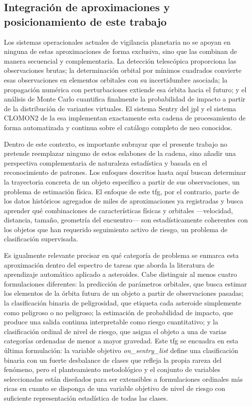 \documentclass[12pt]{report} %
\begin{document}
\subsection{Integración de aproximaciones y posicionamiento de este trabajo}
 
Los sistemas operacionales actuales de vigilancia planetaria no se apoyan en ninguna de estas aproximaciones de forma exclusiva, sino que las combinan de manera secuencial y complementaria. La detección telescópica proporciona las observaciones brutas; la determinación orbital por mínimos cuadrados convierte esas observaciones en elementos orbitales con su incertidumbre asociada; la propagación numérica con perturbaciones extiende esa órbita hacia el futuro; y el análisis de Monte Carlo cuantifica finalmente la probabilidad de impacto a partir de la distribución de variantes virtuales. El sistema Sentry del \gls{jpl} y el sistema CLOMON2 de la \gls{esa} implementan exactamente esta cadena de procesamiento de forma automatizada y continua sobre el catálogo completo de \gls{neo} conocidos.
 
Dentro de este contexto, es importante subrayar que el presente trabajo no pretende reemplazar ninguno de estos eslabones de la cadena, sino añadir una perspectiva complementaria de naturaleza estadística y basada en el reconocimiento de patrones. Los enfoques descritos hasta aquí buscan determinar la trayectoria concreta de un objeto específico a partir de sus observaciones, un problema de estimación física. El enfoque de este \gls{tfg}, por el contrario, parte de los datos históricos agregados de miles de aproximaciones ya registradas y busca aprender qué combinaciones de características físicas y orbitales ---velocidad, distancia, tamaño, geometría del encuentro--- son estadísticamente coherentes con los objetos que han requerido seguimiento activo de riesgo, un problema de clasificación supervisada.
 
Es igualmente relevante precisar en qué categoría de problema se enmarca esta aproximación dentro del espectro de tareas que aborda la literatura de aprendizaje automático aplicado a asteroides. Cabe distinguir al menos cuatro formulaciones diferentes: la predicción de parámetros orbitales, que busca estimar los elementos de la órbita futura de un objeto a partir de observaciones pasadas; la clasificación binaria de peligrosidad, que etiqueta cada asteroide simplemente como peligroso o no peligroso; la estimación de probabilidad de impacto, que produce una salida continua interpretable como riesgo cuantitativo; y la clasificación ordinal de nivel de riesgo, que asigna el objeto a una de varias categorías ordenadas de menor a mayor gravedad. Este \gls{tfg} se encuadra en esta última formulación: la variable objetivo \textit{on\_sentry\_list} define una clasificación binaria con un fuerte desbalance de clases que refleja la propia rareza del fenómeno, pero el planteamiento metodológico y el conjunto de variables seleccionadas están diseñados para ser extensibles a formulaciones ordinales más ricas en cuanto se disponga de una variable objetivo de nivel de riesgo con suficiente representación estadística de todas las clases.
\end{document}
